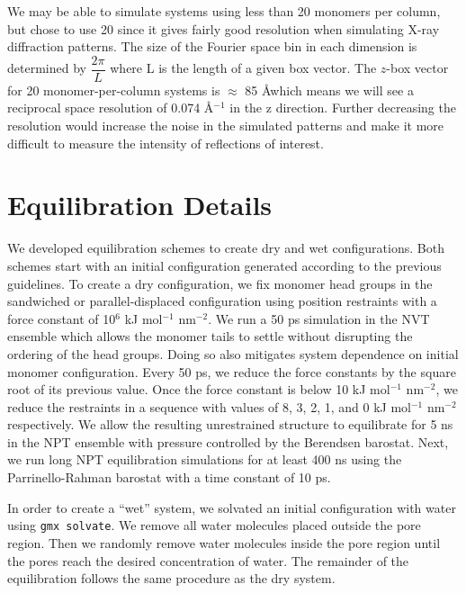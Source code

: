 \documentclass{article}
\begin{document}
  We may be able to simulate systems using less than 20 monomers per column, but chose
  to use 20 since it gives fairly good resolution when simulating X-ray diffraction 
  patterns. The size of the Fourier space bin in each dimension is determined by 
  $\dfrac{2\pi}{L}$ where L is the length of a given box vector. The $z$-box vector 
  for 20 monomer-per-column systems is $\approx$ 85 \AA which means we will see 
  a reciprocal space resolution of 0.074 \AA$^{-1}$ in the z direction. Further decreasing
  the resolution would increase the noise in the simulated patterns and make it more
  difficult to measure the intensity of reflections of interest.

  \section{Equilibration Details}\label{section:equilibration}
  
  We developed equilibration schemes to create dry and wet configurations. Both
  schemes start with an initial configuration generated according to the previous
  guidelines. To create a dry configuration, we fix monomer head groups in the
  sandwiched or parallel-displaced configuration using position restraints with a
  force constant of 10$^6$ kJ mol$^{-1}$ nm$^{-2}$. We run a 50 ps simulation in
  the NVT ensemble which allows the monomer tails to settle without disrupting
  the ordering of the head groups. Doing so also mitigates system dependence on
  initial monomer configuration. Every 50 ps, we reduce the force constants by
  the square root of its previous value. Once the force constant is below 10 kJ
  mol$^{-1}$ nm$^{-2}$, we reduce the restraints in a sequence with values of
  8, 3, 2, 1, and 0 kJ mol$^{-1}$ nm$^{-2}$ respectively. We allow the resulting
  unrestrained structure to equilibrate for 5 ns in the NPT ensemble
  with pressure controlled by the Berendsen barostat. Next, we run long NPT
  equilibration simulations for at least 400 ns using the Parrinello-Rahman
  barostat with a time constant of 10 ps.

  In order to create a ``wet'' system, we solvated an initial configuration with
  water using \texttt{gmx solvate}. We remove all water molecules placed outside
  the pore region. Then we randomly remove water molecules inside the pore region
  until the pores reach the desired concentration of water. The remainder of the
  equilibration follows the same procedure as the dry system. 
\end{document}
